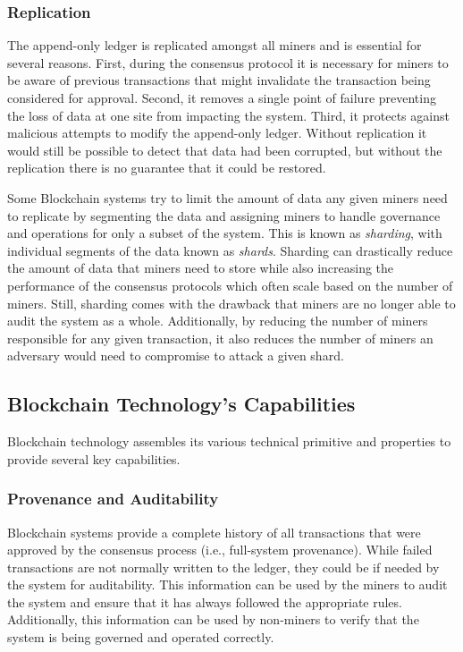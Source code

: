 \subsubsection{Replication}
The append-only ledger is replicated amongst all miners and is essential for several reasons.
First, during the consensus protocol it is necessary for miners to be aware of previous transactions that might invalidate the transaction being considered for approval.
Second, it removes a single point of failure preventing the loss of data at one site from impacting the system.
Third, it protects against malicious attempts to modify the append-only ledger. Without replication it would still be possible to detect that data had been corrupted, but without the replication there is no guarantee that it could be restored.

Some Blockchain systems try to limit the amount of data any given miners need to replicate by segmenting the data and assigning miners to handle governance and operations for only a subset of the system.
This is known as \emph{sharding}, with individual segments of the data known as \emph{shards}.
Sharding can drastically reduce the amount of data that miners need to store while also increasing the performance of the consensus protocols which often scale based on the number of miners.
Still, sharding comes with the drawback that miners are no longer able to audit the system as a whole.
Additionally, by reducing the number of miners responsible for any given transaction, it also reduces the number of miners an adversary would need to compromise to attack a given shard.

\subsection{Blockchain Technology's Capabilities}
Blockchain technology assembles its various technical primitive and properties to provide several key capabilities.

\subsubsection{Provenance and Auditability}
Blockchain systems provide a complete history of all transactions that were approved by the consensus process (i.e., full-system provenance).
While failed transactions are not normally written to the ledger, they could be if needed by the system for auditability.
This information can be used by the miners to audit the system and ensure that it has always followed the appropriate rules.
Additionally, this information can be used by non-miners to verify that the system is being governed and operated correctly.

